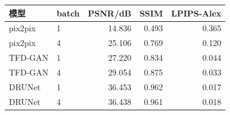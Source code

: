 \begin{tabular}{@{}llrrr@{}}
\toprule
模型 & batch & PSNR/dB & SSIM & LPIPS-Alex\\
\midrule
pix2pix & 1 & 14.836 & 0.493 & 0.365\\
pix2pix & 4 & 25.106 & 0.769 & 0.120\\
TFD-GAN & 1 & 27.220 & 0.834 & 0.044\\
TFD-GAN & 4 & 29.054 & 0.875 & 0.033\\
DRUNet & 1 & 36.453 & 0.962 & 0.017\\
DRUNet & 4 & 36.438 & 0.961 & 0.018\\
\bottomrule
\end{tabular}
